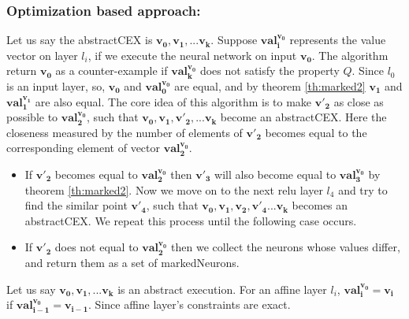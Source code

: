 \subsubsection{Optimization based approach: }

Let us say the abstractCEX is $\boldsymbol{v_0}, \boldsymbol{v_1}, ... \boldsymbol{v_k}$. 
Suppose $\boldsymbol{val_i^{\boldsymbol{v_0}}}$ represents the value vector on layer $l_i$, 
if we execute the neural network on input $\boldsymbol{v_0}$. 
The algorithm return $\boldsymbol{v_0}$ as a counter-example if $\boldsymbol{val_k^{\boldsymbol{v_0}}}$ 
does not satisfy the property $Q$. 
Since $l_0$ is an input layer, so, $\boldsymbol{v_0}$ and $\boldsymbol{val_0^{v_0}}$ are equal, 
and by theorem \ref{th:marked2} $\boldsymbol{v_1}$ and $\boldsymbol{val_1^{v_1}}$ are also equal. 
The core idea of this algorithm is to make $\boldsymbol{v'_2}$ as close as possible to $\boldsymbol{val_2^{v_0}}$, 
such that $\boldsymbol{v_0}, \boldsymbol{v_1}, \boldsymbol{v'_2}, ... \boldsymbol{v_k}$ become an abstractCEX. 
Here the closeness measured by the number of elements of $\boldsymbol{v'_2}$ becomes equal to the 
corresponding element of vector $\boldsymbol{val_2^{v_0}}$.
\begin{itemize}
  \item If $\boldsymbol{v'_2}$ becomes equal to $\boldsymbol{val_2^{v_0}}$ then $\boldsymbol{v'_3}$ will also become 
    equal to $\boldsymbol{val_3^{v_0}}$ by theorem \ref{th:marked2}. 
    Now we move on to the next relu layer $l_4$ and try to find the similar point $\boldsymbol{v'_4}$, such that 
    $\boldsymbol{v_0}, \boldsymbol{v_1}, \boldsymbol{v_2}, \boldsymbol{v'_4}... \boldsymbol{v_k}$ becomes an abstractCEX. 
    We repeat this process until the following case occurs. 
  \item If $\boldsymbol{v'_2}$ does not equal to $\boldsymbol{val_2^{v_0}}$ then we collect the neurons whose values differ, 
        and return them as a set of markedNeurons. 
\end{itemize}



\begin{theorem}
  \label{th:marked2}
  Let us say $\boldsymbol{v_0}, \boldsymbol{v_1}, ... \boldsymbol{v_k}$ is an abstract execution. 
  For an affine layer $l_i$, $\boldsymbol{val_i^{\boldsymbol{v_0}}} = \boldsymbol{v_i}$ if $\boldsymbol{val_{i-1}^{\boldsymbol{v_0}}} = \boldsymbol{v_{i-1}}$.  
  Since affine layer's constraints are exact.  
\end{theorem}
 

